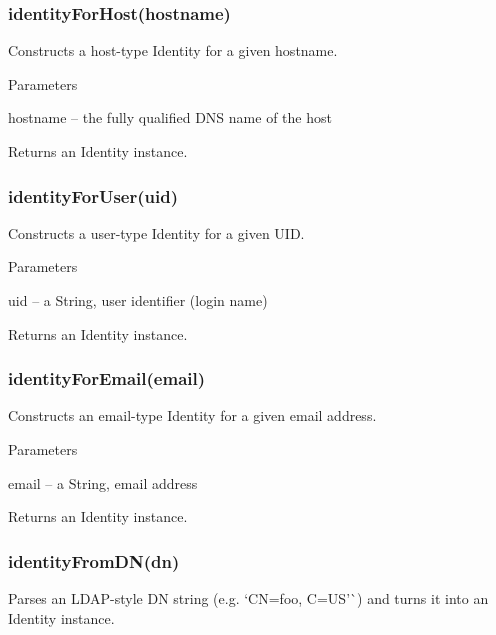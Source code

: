 \subsubsection*{{\ttfamily identity\+For\+Host(hostname)}}

Constructs a host-\/type Identity for a given hostname.

Parameters


\begin{DoxyItemize}
\item {\ttfamily hostname} -- the fully qualified D\+NS name of the host
\end{DoxyItemize}

Returns an Identity instance.

\subsubsection*{{\ttfamily identity\+For\+User(uid)}}

Constructs a user-\/type Identity for a given U\+ID.

Parameters


\begin{DoxyItemize}
\item {\ttfamily uid} -- a String, user identifier (login name)
\end{DoxyItemize}

Returns an Identity instance.

\subsubsection*{{\ttfamily identity\+For\+Email(email)}}

Constructs an email-\/type Identity for a given email address.

Parameters


\begin{DoxyItemize}
\item {\ttfamily email} -- a String, email address
\end{DoxyItemize}

Returns an Identity instance.

\subsubsection*{{\ttfamily identity\+From\+D\+N(dn)}}

Parses an L\+D\+A\+P-\/style DN string (e.\+g. `\textquotesingle{}CN=foo, C=US'\`{}) and turns it into an Identity instance.

